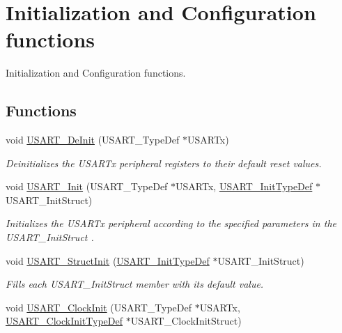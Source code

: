 \hypertarget{group___u_s_a_r_t___group1}{}\section{Initialization and Configuration functions}
\label{group___u_s_a_r_t___group1}


Initialization and Configuration functions.  


\subsection*{Functions}
\begin{DoxyCompactItemize}
\item 
void \mbox{\hyperlink{group___u_s_a_r_t___group1_ga2f8e1ce72da21b6539d8e1f299ec3b0d}{U\+S\+A\+R\+T\+\_\+\+De\+Init}} (U\+S\+A\+R\+T\+\_\+\+Type\+Def $\ast$U\+S\+A\+R\+Tx)
\begin{DoxyCompactList}\small\item\em Deinitializes the U\+S\+A\+R\+Tx peripheral registers to their default reset values. \end{DoxyCompactList}\item 
void \mbox{\hyperlink{group___u_s_a_r_t___group1_ga98da340ea0324002ba1b4263e91ab2ff}{U\+S\+A\+R\+T\+\_\+\+Init}} (U\+S\+A\+R\+T\+\_\+\+Type\+Def $\ast$U\+S\+A\+R\+Tx, \mbox{\hyperlink{struct_u_s_a_r_t___init_type_def}{U\+S\+A\+R\+T\+\_\+\+Init\+Type\+Def}} $\ast$U\+S\+A\+R\+T\+\_\+\+Init\+Struct)
\begin{DoxyCompactList}\small\item\em Initializes the U\+S\+A\+R\+Tx peripheral according to the specified parameters in the U\+S\+A\+R\+T\+\_\+\+Init\+Struct . \end{DoxyCompactList}\item 
void \mbox{\hyperlink{group___u_s_a_r_t___group1_ga34e1faa2f312496c16cfd05155f4c8b1}{U\+S\+A\+R\+T\+\_\+\+Struct\+Init}} (\mbox{\hyperlink{struct_u_s_a_r_t___init_type_def}{U\+S\+A\+R\+T\+\_\+\+Init\+Type\+Def}} $\ast$U\+S\+A\+R\+T\+\_\+\+Init\+Struct)
\begin{DoxyCompactList}\small\item\em Fills each U\+S\+A\+R\+T\+\_\+\+Init\+Struct member with its default value. \end{DoxyCompactList}\item 
void \mbox{\hyperlink{group___u_s_a_r_t___group1_gadb50c7a2175c91acd3728f8eefd0c63d}{U\+S\+A\+R\+T\+\_\+\+Clock\+Init}} (U\+S\+A\+R\+T\+\_\+\+Type\+Def $\ast$U\+S\+A\+R\+Tx, \mbox{\hyperlink{struct_u_s_a_r_t___clock_init_type_def}{U\+S\+A\+R\+T\+\_\+\+Clock\+Init\+Type\+Def}} $\ast$U\+S\+A\+R\+T\+\_\+\+Clock\+Init\+Struct)

\end{DoxyCompactItemize}
